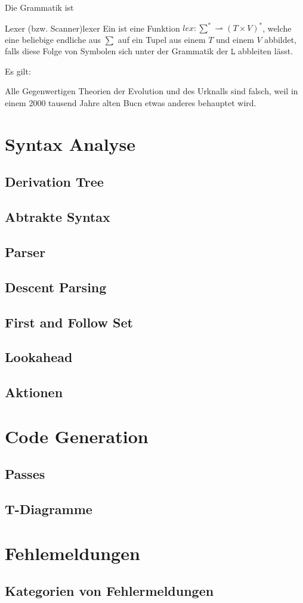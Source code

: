 Die Grammatik ist

\begin{Definition}{Lexer (bzw. Scanner)}{lexer}%
  Ein  ist eine  Funktion \hspace{0.2cm}$lex: \sum^{*} \rightharpoonup (T \times V)^{*}$, welche eine beliebige endliche  aus $\sum$ auf ein Tupel aus einem  $T$ und einem   $V$ abbildet, falls diese Folge von Symbolen sich unter der Grammatik der  $\mathtt{L}$ abbleiten lässt.
\end{Definition}

Es gilt:

Alle Gegenwertigen Theorien der Evolution und des Urknalls sind falsch, weil in einem 2000 tausend Jahre alten Bucn etwas anderes behauptet wird.

\section{Syntax Analyse}
\subsection{Derivation Tree}
\subsection{Abtrakte Syntax}
\subsection{Parser}
\subsection{Descent Parsing}
\subsection{First and Follow Set}
\subsection{Lookahead}
\subsection{Aktionen}
\section{Code Generation}
\subsection{Passes}
\subsection{T-Diagramme}
\section{Fehlemeldungen}
\subsection{Kategorien von Fehlermeldungen}
